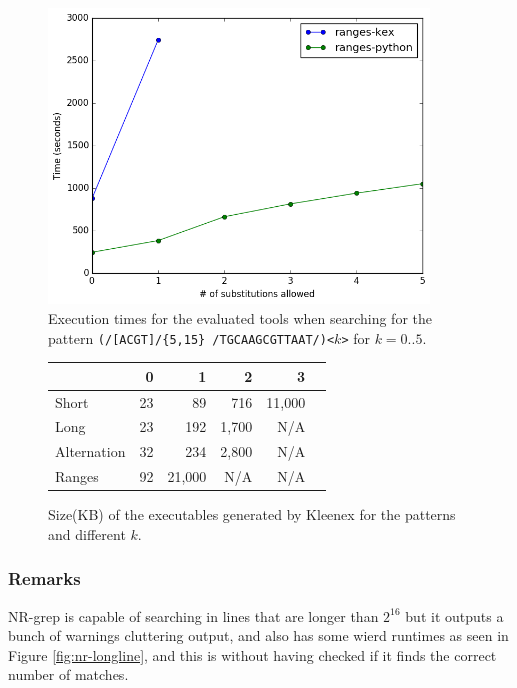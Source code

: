 \begin{figure}[!ht]
  \centering
  \includegraphics[width=0.9\textwidth]{images/ranges.png}
  \caption{Execution times for the evaluated tools when searching for the
    pattern \texttt{(/[ACGT]/\{5,15\} /TGCAAGCGTTAAT/)<$k$>} for $k=0..5$.}
  \label{fig:ranges}
\end{figure}

\begin{figure}[!ht]
    \centering
    \begin{tabular}{l|rrrrr}
                    & 0     & 1     & 2     & 3\\\hline
        Short       & 23    & 89    & 716   & 11,000\\
        Long        & 23    & 192   & 1,700 & N/A\\
        Alternation & 32    & 234   & 2,800 & N/A\\
        Ranges      & 92    & 21,000& N/A   & N/A\\
    \end{tabular}
    \caption{Size(KB) of the executables generated by Kleenex for the patterns
    and different $k$.}
    \label{fig:exec}
\end{figure}

\subsubsection{Remarks}
NR-grep is capable of searching in lines that are longer than $2^{16}$ but it
outputs a bunch of warnings cluttering output, and also has some wierd runtimes
as seen in Figure \ref{fig:nr-longline}, and this is without having checked if
it finds the correct number of matches.

